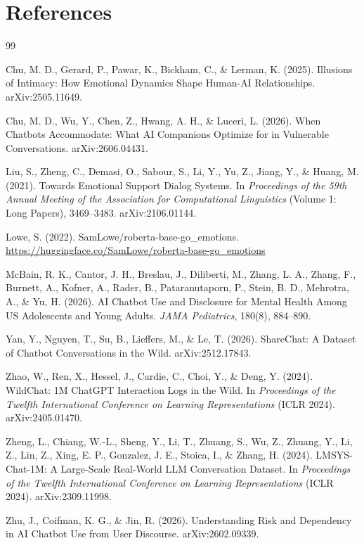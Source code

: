 \documentclass[11pt]{article}
\begin{document}
\section*{References}
\begin{thebibliography}{99}

Chu, M. D., Gerard, P., Pawar, K., Bickham, C., \& Lerman, K. (2025). Illusions of Intimacy: How Emotional Dynamics Shape Human-AI Relationships. arXiv:2505.11649.

Chu, M. D., Wu, Y., Chen, Z., Hwang, A. H., \& Luceri, L. (2026). When Chatbots Accommodate: What AI Companions Optimize for in Vulnerable Conversations. arXiv:2606.04431.

Liu, S., Zheng, C., Demasi, O., Sabour, S., Li, Y., Yu, Z., Jiang, Y., \& Huang, M. (2021). Towards Emotional Support Dialog Systems. In \emph{Proceedings of the 59th Annual Meeting of the Association for Computational Linguistics} (Volume 1: Long Papers), 3469--3483. arXiv:2106.01144.

Lowe, S. (2022). SamLowe/roberta-base-go\_emotions. \url{https://huggingface.co/SamLowe/roberta-base-go_emotions}

McBain, R. K., Cantor, J. H., Breslau, J., Diliberti, M., Zhang, L. A., Zhang, F., Burnett, A., Kofner, A., Rader, B., Pataranutaporn, P., Stein, B. D., Mehrotra, A., \& Yu, H. (2026). AI Chatbot Use and Disclosure for Mental Health Among US Adolescents and Young Adults. \emph{JAMA Pediatrics}, 180(8), 884--890.

Yan, Y., Nguyen, T., Su, B., Lieffers, M., \& Le, T. (2026). ShareChat: A Dataset of Chatbot Conversations in the Wild. arXiv:2512.17843.

Zhao, W., Ren, X., Hessel, J., Cardie, C., Choi, Y., \& Deng, Y. (2024). WildChat: 1M ChatGPT Interaction Logs in the Wild. In \emph{Proceedings of the Twelfth International Conference on Learning Representations} (ICLR 2024). arXiv:2405.01470.

Zheng, L., Chiang, W.-L., Sheng, Y., Li, T., Zhuang, S., Wu, Z., Zhuang, Y., Li, Z., Lin, Z., Xing, E. P., Gonzalez, J. E., Stoica, I., \& Zhang, H. (2024). LMSYS-Chat-1M: A Large-Scale Real-World LLM Conversation Dataset. In \emph{Proceedings of the Twelfth International Conference on Learning Representations} (ICLR 2024). arXiv:2309.11998.

Zhu, J., Coifman, K. G., \& Jin, R. (2026). Understanding Risk and Dependency in AI Chatbot Use from User Discourse. arXiv:2602.09339.

\end{thebibliography}
\end{document}
